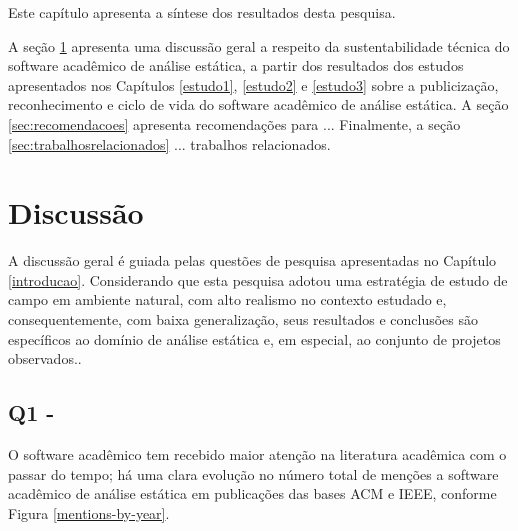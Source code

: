 \label{discussao}


Este capítulo apresenta 
a síntese dos resultados desta pesquisa.

A seção \ref{sec:discussao} apresenta 
uma discussão geral a respeito da
sustentabilidade técnica do software acadêmico de análise estática,
a partir dos resultados dos estudos apresentados nos Capítulos \ref{estudo1}, \ref{estudo2} e
\ref{estudo3} sobre a publicização, reconhecimento e ciclo de vida do software
acadêmico de análise estática.
A seção \ref{sec:recomendacoes} apresenta recomendações para ... 
Finalmente, a seção \ref{sec:trabalhosrelacionados} ... trabalhos relacionados.



\section{Discussão}
\label{sec:discussao}

A discussão geral é guiada pelas questões de pesquisa apresentadas no
Capítulo \ref{introducao}.
Considerando que esta pesquisa adotou uma estratégia de 
estudo de campo em ambiente natural,
com alto realismo no contexto estudado e,
consequentemente, com baixa generalização,
seus resultados e conclusões são específicos 
ao domínio de análise estática e, em especial,
ao conjunto de projetos observados..


\subsection{Q1 - \QuestaoUm} %

O software acadêmico tem recebido maior atenção na literatura acadêmica com o
passar do tempo; há uma clara evolução no número total de menções a software
acadêmico de análise estática em publicações das bases ACM e IEEE, conforme
Figura \ref{mentions-by-year}.

